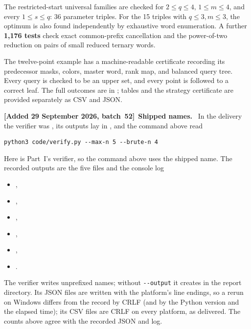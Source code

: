 \documentclass[11pt,letterpaper]{article}
\numberwithin{equation}{section}
\theoremstyle{definition}
\theoremstyle{remark}
\theoremstyle{definition}
\newenvironment{writenote}[1][]{\par\smallskip\begingroup\small\sloppy
 \noindent\textbf{[Added 29 September 2026, batch~52]}\if\relax\detokenize{#1}\relax\else~\textbf{#1.}\fi\ }%
 {\par\endgroup\smallskip}
\begin{document}
The restricted-start universal families are checked for $2\le q\le4$,
$1\le m\le4$, and every $1\le s\le q$: 36 parameter triples.
For the 15 triples with $q\le3,m\le3$, the optimum is also found independently
by exhaustive word enumeration. A further \textbf{1,176 tests} check exact
common-prefix cancellation and the power-of-two reduction on pairs of small
reduced ternary words.

\begin{sloppypar}
The twelve-point example has a machine-readable certificate recording its
predecessor masks, colors, master word, rank map, and balanced query tree. Every
query is checked to be an upper set, and every point is followed to a correct
leaf. The full outcomes are in
; tables and the
strategy certificate are provided separately as CSV and JSON.
\end{sloppypar}

\begin{writenote}[Shipped names]
In the delivery the verifier was , its outputs lay in
, and the command above read
\begin{lstlisting}
python3 code/verify.py --max-n 5 --brute-n 4
\end{lstlisting}
Here  is Part~I's verifier, so the command above uses the
shipped name. The recorded outputs are the five files and the console log
\begin{itemize}
\item {},
\item {},
\item {},
\item {},
\item {},
\item {}.
\end{itemize}
The verifier writes unprefixed names; without \texttt{-{}-output} it creates  in the report
directory. Its
JSON files are written with the platform's line endings, so a rerun on
Windows differs from the record by CRLF (and by the Python version and the
elapsed time); its CSV files are CRLF on every platform, as delivered. The
counts above agree with the recorded JSON and log.
\end{writenote}
\end{document}
